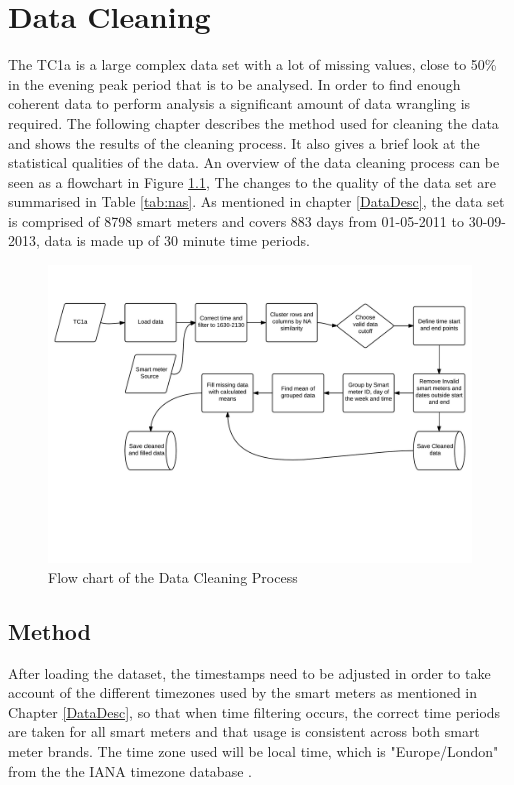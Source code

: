 
\chapter{Data Cleaning}
\label{DataCleaning}

The TC1a is a large complex data set with a lot of missing values, close to 50\% in the evening peak period that is to be analysed. In order to find enough coherent data to perform analysis a significant amount of data wrangling is required. The following chapter describes the method used for cleaning the data and shows the results of the cleaning process. It also gives a brief look at the statistical qualities of the data. An overview of the data cleaning process can be seen as a flowchart in Figure \ref{fig:CleanFlow}, The changes to the quality of the data set are summarised in Table \ref{tab:nas}.
As mentioned in chapter \ref{DataDesc}, the data set is comprised of 8798 smart meters and covers 883 days from 01-05-2011 to 30-09-2013, data is made up of 30 minute time periods.

\begin{figure}[ht]
    \centering
    \includegraphics[width =\textwidth]{Figures/Appendix/DataCleaning.png}
    \caption[Data cleaning process]{Flow chart of the Data Cleaning Process}
    \label{fig:CleanFlow}
\end{figure}


\section{Method}

After loading the dataset, the timestamps need to be adjusted in order to take account of the different timezones used by the smart meters as mentioned in Chapter \ref{DataDesc}, so that when time filtering occurs, the correct time periods are taken for all smart meters and that usage is consistent across both smart meter brands. The time zone used will be local time, which is "Europe/London" from the the IANA timezone database \cite{iananumberresources1918}.

